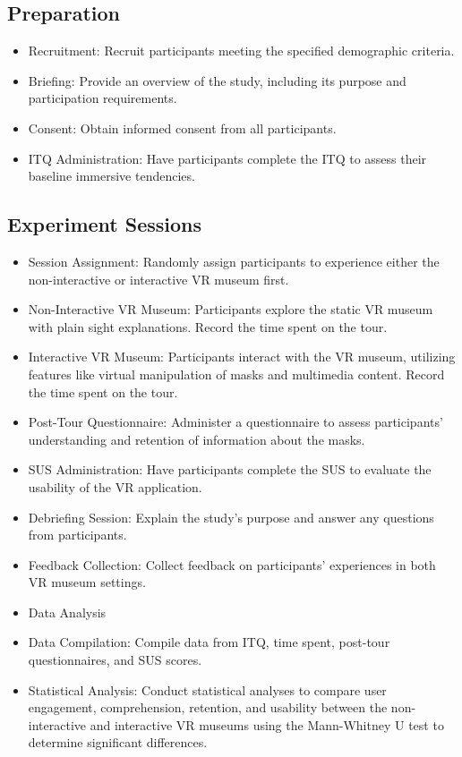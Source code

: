\documentclass[conference]{IEEEtran}
\begin{document}
\subsection{Preparation}
\begin{itemize}
\item Recruitment: Recruit participants meeting the specified demographic criteria.
\item Briefing: Provide an overview of the study, including its purpose and participation requirements.
\item Consent: Obtain informed consent from all participants.
\item ITQ Administration: Have participants complete the ITQ to assess their baseline immersive tendencies.
\end{itemize}
\subsection{Experiment Sessions}
\begin{itemize}
\item Session Assignment: Randomly assign participants to experience either the non-interactive or interactive VR museum first.
\item Non-Interactive VR Museum: Participants explore the static VR museum with plain sight explanations. Record the time spent on the tour.
\item Interactive VR Museum: Participants interact with the VR museum, utilizing features like virtual manipulation of masks and multimedia content. Record the time spent on the tour.
\item Post-Tour Questionnaire: Administer a questionnaire to assess participants' understanding and retention of information about the masks.
\item SUS Administration: Have participants complete the SUS to evaluate the usability of the VR application.
\item Debriefing Session: Explain the study's purpose and answer any questions from participants.
\item Feedback Collection: Collect feedback on participants' experiences in both VR museum settings.
\item Data Analysis
\item Data Compilation: Compile data from ITQ, time spent, post-tour questionnaires, and SUS scores.
\item Statistical Analysis: Conduct statistical analyses to compare user engagement, comprehension, retention, and usability between the non-interactive and interactive VR museums using the Mann-Whitney U test to determine significant differences.
\end{itemize}
\end{document}
